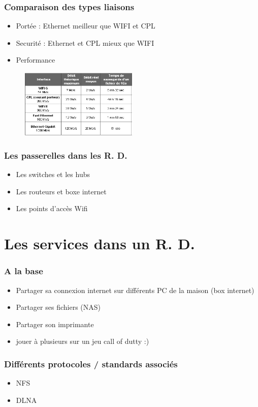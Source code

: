 \documentclass[handout]{beamer}
\begin{document}
\begin{frame}\frametitle{Comparaison des types liaisons} 
\begin{itemize}
\item Portée : Ethernet meilleur que WIFI et CPL
\item Securité : Ethernet et CPL mieux que WIFI
\item Performance
\end{itemize}
\begin{figure}
		\centering
		\includegraphics[width=0.5\textwidth,natwidth=100,natheight=100]{image/performance.png}
\end{figure}
\end{frame}

\begin{frame}\frametitle{Les passerelles dans les R. D.} 
\begin{itemize}
\item Les switches et les hubs
\item Les routeurs et boxe internet
\item Les points d'accès Wifi
\end{itemize}
\end{frame}

\section{Les services dans un R. D.}
\begin{frame}\frametitle{A la base } 
\begin{itemize}
\item Partager sa connexion internet sur différents PC de la maison (box internet) 
\item Partager ses fichiers (NAS)
\item Partager son imprimante
\item jouer à plusieurs sur un jeu call of dutty   :)
\end{itemize}
\end{frame}

\begin{frame}\frametitle{Différents protocoles / standards associés} 
\begin{itemize}
\item NFS 
\item DLNA
\end{itemize}
\end{frame}
\end{document}
